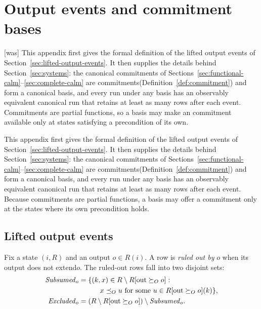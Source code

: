 \documentclass[sigconf]{cidr-2027}
\theoremstyle{remark}
\newcommand{\OutputOrd}{\preceq_O}
\newcommand{\OutputGe}{\succeq_O}
\newcommand{\commitment}{commitment\xspace}
\newcommand{\commitments}{commitments\xspace}
\newcommand{\Commitments}{Commitments\xspace}
\newcommand{\outrelbase}{extend\xspace}       %
\newcommand{\Subsumed}{\mathit{Subsumed}}
\newcommand{\Excluded}{\mathit{Excluded}}
\begin{document}
\section{Output events and \commitment bases}
\label{app:bases}



{\footnotesize\color{black!50}\noindent\textsf{[was]} This appendix first gives the formal definition of the lifted output events of
Section~\ref{sec:lifted-output-events}.  It then supplies the details behind
Section~\ref{sec:systems}: the canonical \commitments of
Sections~\ref{sec:functional-calm}--\ref{sec:complete-calm}
are \commitments (Definition~\ref{def:commitment}) and form a canonical basis,
and every run under any basis
has an observably equivalent canonical run that retains at least as many rows
after each event.  \Commitments are partial functions, so a basis may make an
\commitment available only at states satisfying a precondition of its own.\par}

\color{blue!70!black}This appendix first gives the formal definition of the lifted output events of
Section~\ref{sec:lifted-output-events}.  It then supplies the details behind
Section~\ref{sec:systems}: the canonical \commitments of
Sections~\ref{sec:functional-calm}--\ref{sec:complete-calm}
are \commitments (Definition~\ref{def:commitment}) and form a canonical basis,
and every run under any basis
has an observably equivalent canonical run that retains at least as many rows
after each event.  Because \commitments are partial functions, a basis may
offer a \commitment only at the states where its own precondition holds.\color{black}

\subsection{Lifted output events}
\label{app:lifted-output-events}

Fix a state $(i,R)$ and an output $o\in R(i)$.  A row is \emph{ruled out by}
$o$ when its output does not \outrelbase $o$.  The ruled-out rows fall into two
disjoint sets:
\begin{align}
  \Subsumed_o&=\{(k,x)\in R\setminus R[\mathrm{out}\OutputGe o]:\notag\\
    &\qquad\quad x\OutputOrd u\text{ for some }u\in R[\mathrm{out}\OutputGe o](k)\},
      \label{eq:output-subsumptions}\\
  \Excluded_o&=(R\setminus R[\mathrm{out}\OutputGe o])\setminus\Subsumed_o.
      \label{eq:commitment-removals}
\end{align}
\end{document}
